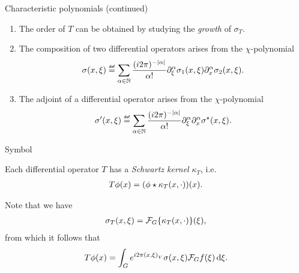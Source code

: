 \documentclass{beamer}
\begin{document}
\begin{frame}
    {Characteristic polynomials (continued)}

    \begin{enumerate}
        \item
            The order of $T$ can be obtained by studying the \emph{growth} of $\sigma_T$.
            \pause
        \item
            The composition of two differential operators arises from the $\chi$-polynomial
            \begin{align}
                \sigma(x, \xi)
                \defeq
                \sum_{\alpha \in \N}
                \frac {(i \turn)^{-\abs \alpha}} {\alpha!}
                \iD {\xi^\alpha} \sigma_1(x, \xi)
                \iD {x^\alpha} \sigma_2(x, \xi).
                \label{eq:Euclidean_composition_formula}
            \end{align}
            \pause
        \item
            The adjoint of a differential operator arises from the $\chi$-polynomial
            \begin{align}
                \sigma'(x, \xi)
                \defeq
                \sum_{\alpha \in \N}
                \frac {(i \turn)^{-\abs \alpha}} {\alpha!}
                \iD {\xi^\alpha}
                \iD {x^\alpha} \adj \sigma(x, \xi).
                \label{eq:Euclidean_adjunction_formula}
            \end{align}
    \end{enumerate}
\end{frame}

\begin{frame}
    {Symbol}

    Each differential operator $T$ has a \emph{Schwartz kernel} $\kappa_T$, i.e.\
    \begin{align*}
        T \phi(x) = (\phi \star \kappa_T(x, \cdot))(x).
    \end{align*}

    \pause
    Note that we have
    \begin{align*}
        \sigma_T(x, \xi)
        = \mathcal{F}_{G} \{\kappa_T(x, \cdot)\}(\xi),
    \end{align*}
    \pause
    from which it follows that
    \begin{align*}
        T \phi(x) =
        \int_{G} e^{i 2 \pi {\left(x, \xi\right)_{V}}} \sigma(x, \xi) \mathcal{F}_{G} f(\xi) \,\mathrm{d} \xi.
    \end{align*}
\end{frame}
\end{document}
